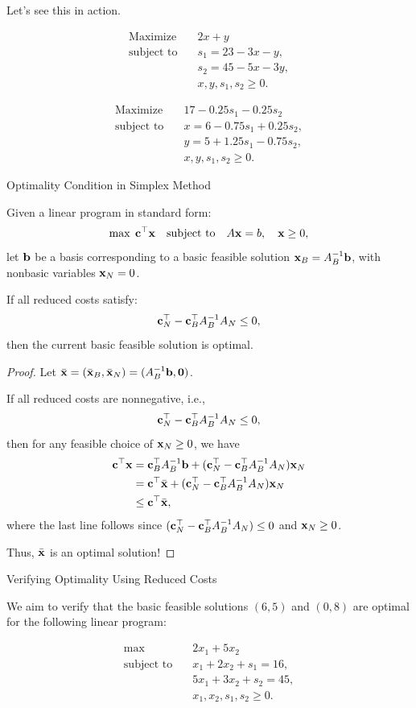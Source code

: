 Let's see this in action.

\[
\begin{aligned}
\text{Maximize}\quad & 2x + y \\
\text{subject to}\quad & s_1 = 23 - 3x - y,\\ 
& s_2 = 45 - 5x - 3y,\\ 
& x, y, s_1, s_2 \ge 0.
\end{aligned}
\]

\[
\begin{aligned}
\text{Maximize}\quad & 17 - 0.25s_1 - 0.25s_2 \\
\text{subject to}\quad & x = 6 - 0.75s_1 + 0.25s_2,\\ 
& y = 5 + 1.25s_1 - 0.75s_2,\\ 
& x, y, s_1, s_2 \ge 0.
\end{aligned}
\]


\begin{theorem}{Optimality Condition in Simplex Method}{}{}

    Given a linear program in standard form:
    \[
    \max \; \mathbf{c}^\top \mathbf{x} \quad \mbox{subject to} \quad A \mathbf{x} = b, \quad \mathbf{x} \geq 0,
    \]
    let \(\mathbf{b}\) be a basis corresponding to a basic feasible solution \( \mathbf{x}_B = A_B^{-1}\mathbf{b}\), with nonbasic variables \( \mathbf{x}_N = 0 \). 

    If all reduced costs satisfy:
    \[
   \mathbf{c}_N^\top -\mathbf{c}_B^\top A_B^{-1} A_N \leq 0,
    \]
    then the current basic feasible solution is optimal.
\end{theorem}
\begin{proof}
Let $\bar {\mathbf{x}} = (\bar {\mathbf{x}}_B, \bar {\mathbf{x}}_N) = (A_B^{-1}\mathbf{b}, \mathbf{0})$.

    If all reduced costs are nonnegative, i.e.,
    \[
   \mathbf{c}_N^\top -\mathbf{c}_B^\top A_B^{-1} A_N \leq 0,
    \]
    then for any feasible choice of \( \mathbf{x}_N \geq 0 \), 
    we have
    \begin{align}
    \mathbf{c}^\top \mathbf{x} &= \mathbf{c}_B^\top A_B^{-1}\mathbf{b}+  (\mathbf{c}_N^\top -\mathbf{c}_B^\top A_B^{-1} A_N )\mathbf{x}_N\\
    &= \mathbf{c}^\top \bar {\mathbf{x}} +  (\mathbf{c}_N^\top -\mathbf{c}_B^\top A_B^{-1} A_N )\mathbf{x}_N\\
    & \leq \mathbf{c}^\top \bar {\mathbf{x}},
    \end{align}
    where the last line follows since $(\mathbf{c}_N^\top -\mathbf{c}_B^\top A_B^{-1} A_N ) \leq 0$ and $\mathbf{x}_N \geq 0$.
    
    Thus, $\bar {\mathbf{x}}$ is an optimal solution!
\end{proof}


\begin{example}{Verifying Optimality Using Reduced Costs}{}{}

We aim to verify that the basic feasible solutions \( (6,5) \) and \( (0,8) \) are optimal for the following linear program:

\[
\begin{aligned}
    \max \quad & 2 x_1 + 5 x_2 \\
    \text{subject to} \quad 
    & x_1 + 2x_2 + s_1 = 16, \\
    & 5x_1 + 3x_2 + s_2 = 45, \\
    & x_1, x_2, s_1, s_2 \geq 0.
\end{aligned}
\]
\end{example}

